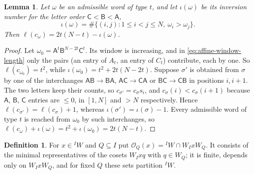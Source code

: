 \documentclass[11pt,a4paper,reqno]{amsart}
\numberwithin{equation}{section}
\newtheorem{lemma}[theorem]{Lemma}
\theoremstyle{definition}
\newtheorem{definition}[theorem]{Definition}
\theoremstyle{remark}
\theoremstyle{plain}
\newcommand{\A}{\mathsf A}
\newcommand{\B}{\mathsf B}
\newcommand{\CC}{\mathsf C}
\begin{document}
\begin{lemma}\label{lem:word-length}
Let $\omega$ be an admissible word of type $t$, and let $\iota(\omega)$ be its inversion number for the letter order
$\CC<\B<\A$,
\[
 \iota(\omega)=\#\{(i,j):1\leq i<j\leq N,\ \omega_i>\omega_j\}.
\]
Then
$\ell(c_\omega)=2t(N-t)-\iota(\omega)$.
\end{lemma}
\begin{proof}
Let $\omega_0=\A^t\B^{N-2t}\CC^t$. 
Its window is increasing, and in \eqref{eq:affine-window-length} only the pairs
(an entry of $A_t$, an entry of $C_t$) contribute, each by one. So $\ell(c_{\omega_0})=t^2$, while
$\iota(\omega_0)=t^2+2t(N-2t)$.
Suppose $\sigma'$ is obtained from $\sigma$ by one of the interchanges $\A\B\to\B\A$, $\A\CC\to\CC\A$ or
$\B\CC\to\CC\B$ in positions $i,i+1$. The two letters keep their counts, so $c_{\sigma'}=c_\sigma s_i$, and
$c_\sigma(i)<c_\sigma(i+1)$ because $\A$, $\B$, $\CC$ entries are $\leq0$, in $[1,N]$ and $>N$ respectively.
Hence $\ell(c_{\sigma'})=\ell(c_\sigma)+1$, whereas $\iota(\sigma')=\iota(\sigma)-1$.
Every admissible word of type $t$ is reached from $\omega_0$ by such interchanges, so
$\ell(c_\omega)+\iota(\omega)=t^2+\iota(\omega_0)=2t(N-t)$.
\end{proof}

\begin{definition}\label{def:orbit}
For $x\in{}^IW$ and $Q\subseteq I$ put $\mathcal O_Q(x)={}^IW\cap W_IxW_Q$. It consists of the minimal
representatives of the cosets $W_Ixq$ with $q\in W_Q$; it is finite, depends only on $W_IxW_Q$, and for fixed $Q$
these sets partition ${}^IW$.
\end{definition}
\end{document}
